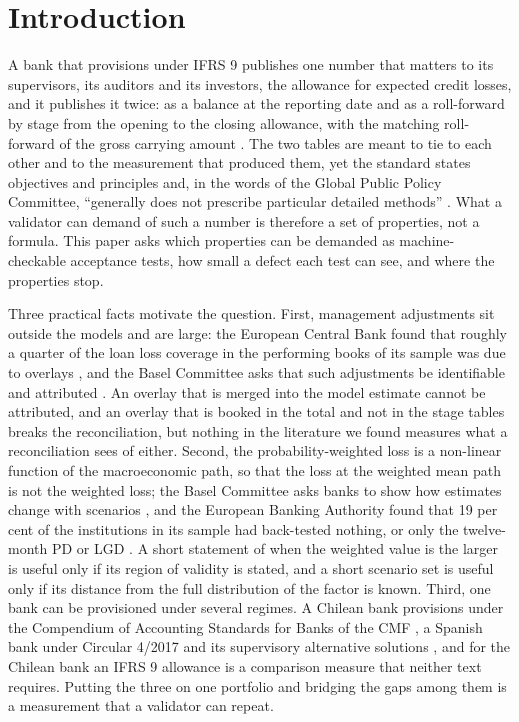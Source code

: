 \section{Introduction}
\label{sec:introduction}

A bank that provisions under IFRS 9 publishes one number that matters to its supervisors, its auditors and its investors, the allowance for expected credit losses, and it publishes it twice: as a balance at the reporting date and as a roll-forward by stage from the opening to the closing allowance, with the matching roll-forward of the gross carrying amount \citep{ifrs9eu}.
The two tables are meant to tie to each other and to the measurement that produced them, yet the standard states objectives and principles and, in the words of the Global Public Policy Committee, ``generally does not prescribe particular detailed methods'' \citep{gppc2016}.
What a validator can demand of such a number is therefore a set of properties, not a formula.
This paper asks which properties can be demanded as machine-checkable acceptance tests, how small a defect each test can see, and where the properties stop.

Three practical facts motivate the question.
First, management adjustments sit outside the models and are large: the European Central Bank found that roughly a quarter of the loan loss coverage in the performing books of its sample was due to overlays \citep{ecb2024}, and the Basel Committee asks that such adjustments be identifiable and attributed \citep{bcbsd350}.
An overlay that is merged into the model estimate cannot be attributed, and an overlay that is booked in the total and not in the stage tables breaks the reconciliation, but nothing in the literature we found measures what a reconciliation sees of either.
Second, the probability-weighted loss is a non-linear function of the macroeconomic path, so that the loss at the weighted mean path is not the weighted loss; the Basel Committee asks banks to show how estimates change with scenarios \citep{bcbsd350}, and the European Banking Authority found that 19 per cent of the institutions in its sample had back-tested nothing, or only the twelve-month PD or LGD \citep{eba2023}.
A short statement of when the weighted value is the larger is useful only if its region of validity is stated, and a short scenario set is useful only if its distance from the full distribution of the factor is known.
Third, one bank can be provisioned under several regimes.
A Chilean bank provisions under the Compendium of Accounting Standards for Banks of the CMF \citep{cmfcncb}, a Spanish bank under Circular 4/2017 and its supervisory alternative solutions \citep{boe2017,boe2021}, and for the Chilean bank an IFRS 9 allowance is a comparison measure that neither text requires.
Putting the three on one portfolio and bridging the gaps among them is a measurement that a validator can repeat.

